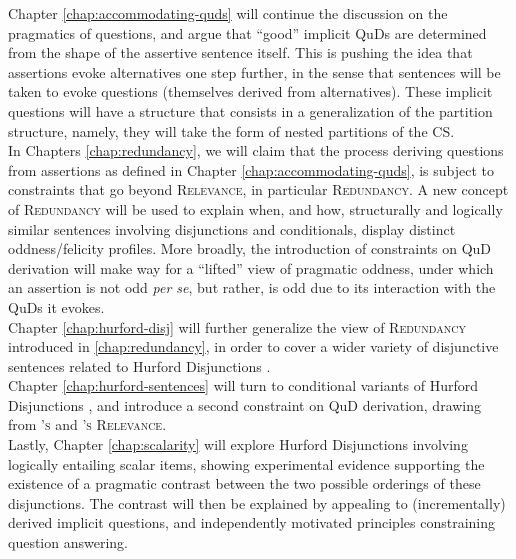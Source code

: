 Chapter \ref{chap:accommodating-quds} will continue the discussion on the pragmatics of questions, and argue that ``good'' implicit QuDs are determined from the shape of the assertive sentence itself. This is pushing the idea that assertions evoke alternatives one step further, in the sense that sentences will be taken to evoke questions (themselves derived from alternatives). These implicit questions will have a structure that consists in a generalization of the partition structure, namely, they will take the form of nested partitions of the CS.\\

In Chapters \ref{chap:redundancy}, we will claim that the process deriving questions from assertions as defined in Chapter \ref{chap:accommodating-quds}, is subject to constraints that go beyond \textsc{Relevance}, in particular \textsc{Redundancy}. A new concept of \textsc{Redundancy} will be used to explain when, and how, structurally and logically similar sentences involving disjunctions and conditionals, display distinct oddness/felicity profiles. More broadly, the introduction of constraints on QuD derivation will make way for a ``lifted'' view of pragmatic oddness, under which an assertion is not odd \textit{per se}, but rather, is odd due to its interaction with the QuDs it evokes.\\

Chapter \ref{chap:hurford-disj} will further generalize the view of \textsc{Redundancy} introduced in \ref{chap:redundancy}, in order to cover a wider variety of disjunctive sentences related to Hurford Disjunctions \parencite{Hurford1974}.\\

Chapter \ref{chap:hurford-sentences} will turn to conditional variants of Hurford Disjunctions \parencite{Mandelkern2018}, and introduce a second constraint on QuD derivation, drawing from \textsc{\citeauthor{Lewis1988}'s} and \textsc{\citeauthor{Roberts2012}'s Relevance}.\\

Lastly, Chapter \ref{chap:scalarity} will explore Hurford Disjunctions involving logically entailing scalar items, showing experimental evidence supporting the existence of a pragmatic contrast between the two possible orderings of these disjunctions. The contrast will then be explained by appealing to (incrementally) derived implicit questions, and independently motivated principles constraining question answering. 






